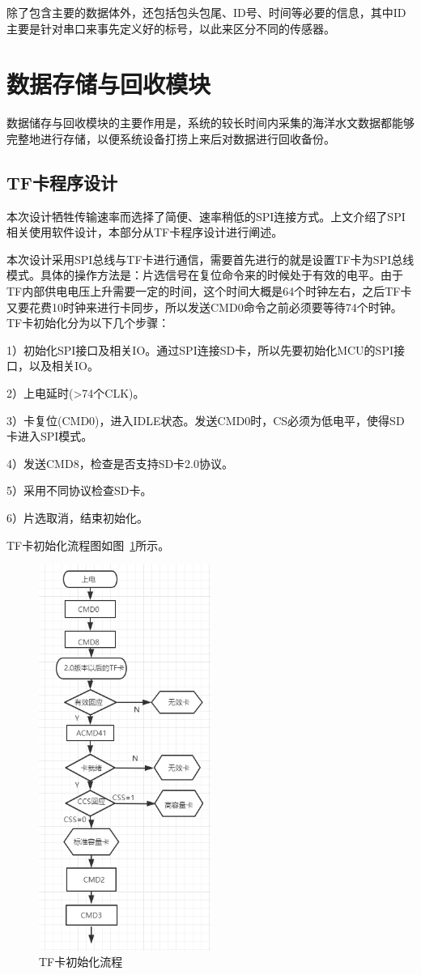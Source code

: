 除了包含主要的数据体外，还包括包头包尾、ID号、时间等必要的信息，其中ID主要是针对串口来事先定义好的标号，以此来区分不同的传感器。

\section{数据存储与回收模块}
数据储存与回收模块的主要作用是，系统的较长时间内采集的海洋水文数据都能够完整地进行存储，以便系统设备打捞上来后对数据进行回收备份。
\subsection{TF卡程序设计}
本次设计牺牲传输速率而选择了简便、速率稍低的SPI连接方式。上文介绍了SPI相关使用软件设计，本部分从TF卡程序设计进行阐述。

本次设计采用SPI总线与TF卡进行通信，需要首先进行的就是设置TF卡为SPI总线模式。具体的操作方法是：片选信号在复位命令来的时候处于有效的电平。由于TF内部供电电压上升需要一定的时间，这个时间大概是64个时钟左右，之后TF卡又要花费10时钟来进行卡同步，所以发送CMD0命令之前必须要等待74个时钟。TF卡初始化分为以下几个步骤：

1）初始化SPI接口及相关IO。通过SPI连接SD卡，所以先要初始化MCU的SPI接口，以及相关IO。

2）上电延时(>74个CLK)。 

3）卡复位(CMD0)，进入IDLE状态。发送CMD0时，CS必须为低电平，使得SD卡进入SPI模式。

4）发送CMD8，检查是否支持SD卡2.0协议。

5）采用不同协议检查SD卡。

6）片选取消，结束初始化。

TF卡初始化流程图如图~\ref{fig:TF卡初始化流程}所示。
\begin{figure}[ht]
    \centering
	\includegraphics[width=0.5\textwidth]{fig/TF卡初始化流程.png}
	\caption{TF卡初始化流程}
	\label{fig:TF卡初始化流程}
\end{figure}
